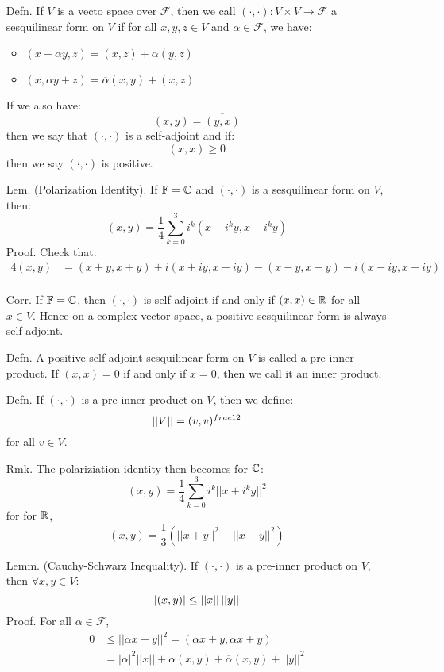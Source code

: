 \documentclass[12pt]{article}
\begin{document}
\begin{itemize}
    \item[Defn.] If $V$ is a vecto space over $\mathcal{F}$, then we call $(\cdot, \cdot): V\times V \to \mathcal{F}$ a sesquilinear form on $V$ if for all $x, y, z \in V$ and $\alpha \in \mathcal{F}$, we have:
    \begin{itemize}
        \item $(x+\alpha y, z) = (x, z) + \alpha(y, z)$
        \item $(x, \alpha y+z) = \overline{\alpha}(x, y) + (x, z)$
    \end{itemize}
    If we also have:
    \[ (x, y) = \overline{(y, x)}\]
    then we say that $(\cdot, \cdot)$ is a self-adjoint and if:
    \[(x, x) \geq 0\]
    then we say $(\cdot, \cdot)$ is positive. 
    \item[Lem.] (Polarization Identity). If $\mathbb{F} = \mathbb C$ and $(\cdot, \cdot)$ is a sesquilinear form on $V$, then:
    \[ (x, y) = \frac 1 4 \sum_{k=0}^3 i^k(x+i^ky, x + i^ky)\]
    Proof. Check that: 
    \begin{align}
        4(x, y) &= (x+y, x+y) + i(x+iy, x+iy) -(x-y, x-y) - i(x-iy, x-iy) \\
    \end{align}
    \item[Corr.] If $\mathbb{F} = \mathbb C$, then $(\cdot, \cdot)$ is self-adjoint if and only if $(x, x) \in \mathbb R$ for all $x \in V$. Hence on a complex vector space, a positive sesquilinear form is always self-adjoint.
    \item[Defn.] A positive self-adjoint sesquilinear form on $V$ is called a pre-inner product. If $(x, x) = 0$ if and only if $x = 0$, then we call it an inner product.  
    \item[Defn. ] If $(\cdot, \cdot)$ is a pre-inner product on $V$, then we define: 
    \[ \left\vert\left\vert V\right\vert\right\vert = (v, v)^{frac12}\]
    for all $v \in V$.
    \item[Rmk.] The polariziation identity then becomes for $\mathbb C$: 
    \[ (x, y) = \frac14 \sum_{k=0}^3 i^k||x+i^ky||^2\]
    for for $\mathbb R$, 
    \[ (x, y) = \frac13(||x+y||^2 - ||x-y||^2)\]
    \item[Lemm.] (Cauchy-Schwarz Inequality). If $(\cdot, \cdot)$ is a pre-inner product on $V$, then $\forall x, y \in V$: 
    \[ |(x, y)| \leq \left\vert\left\vert x\right\vert\right\vert\left\vert\left\vert y\right\vert\right\vert  \]
    Proof. For all $\alpha \in \mathcal{F}$, 
    \begin{align*}
        0 &\leq ||\alpha x + y||^2 = (\alpha x + y, \alpha x + y) \\
        &= |\alpha|^2 ||x|| + \alpha(x, y) + \overline{\alpha}(x, y) + ||y||^2 \\

\end{align*}
\end{itemize}
\end{document}
